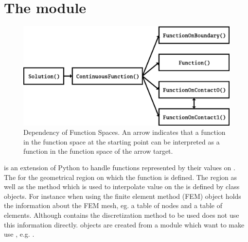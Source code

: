 
\chapter{The module \escript}


\begin{figure}
\includegraphics[width=\textwidth]{EscriptDiagram1.eps}
\caption{\label{ESCRIPT DEP}Dependency of Function Spaces. An arrow indicates that a function in the 
function space at the starting point can be interpreted as a function in the function space of the arrow target.}
\end{figure}

\escript is an extension of Python to handle functions represented by their values on
\DataSamplePoints. The \DataSamplePoints for the geometrical region on which
the function is defined. The region as well as the method which is used 
to interpolate value on the \DataSamplePoints is defined by     
\Domain class objects. For instance when using 
the finite element method (FEM)  
\Domain object holds the information about the FEM mesh, eg. 
a table of nodes and a table of elements. Although \Domain contains
the discretization method to be used \escript does not use this information directly.
\Domain objects are created from a module which want to make use 
\escript, e.g. \finley.

